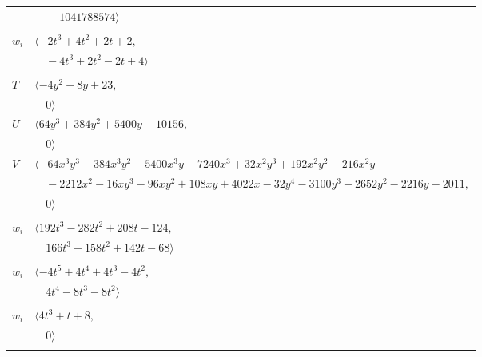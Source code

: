\documentclass[11pt]{article}
\begin{document}
\begin{longtable}{@{}ll@{}}
 & $\quad -1041788574\rangle$\\
\addlinespace[2pt]
\multicolumn{2}{@{}p{0.97\textwidth}@{}}{$i=32$, $D_i=2$, $\rho_{ij}$: $3{:}1, \allowbreak 8{:}2, \allowbreak 14{:}1, \allowbreak 22{:}2, \allowbreak 23{:}2, \allowbreak 31{:}2$}\\
$w_i$ & $\langle -2t^{3}+4t^{2}+2t+2,$\\
 & $\quad -4t^{3}+2t^{2}-2t+4\rangle$\\
\addlinespace[2pt]
\multicolumn{2}{@{}p{0.97\textwidth}@{}}{$i=33$, $D_i=18$, $\rho_{ij}$: $18{:}1, \allowbreak 20{:}1, \allowbreak 26{:}2$}\\
$T$ & $\langle -4y^{2}-8y+23,$\\
 & $\quad 0\rangle$\\
$U$ & $\langle 64y^{3}+384y^{2}+5400y+10156,$\\
 & $\quad 0\rangle$\\
$V$ & $\langle -64x^{3}y^{3}-384x^{3}y^{2}-5400x^{3}y-7240x^{3}+32x^{2}y^{3}+192x^{2}y^{2}-216x^{2}y$\\
 & $\quad -2212x^{2}-16xy^{3}-96xy^{2}+108xy+4022x-32y^{4}-3100y^{3}-2652y^{2}-2216y-2011,$\\
 & $\quad 0\rangle$\\
\addlinespace[2pt]
\multicolumn{2}{@{}p{0.97\textwidth}@{}}{$i=34$, $D_i=8$, $\rho_{ij}$: $0{:}2, \allowbreak 2{:}1, \allowbreak 8{:}2, \allowbreak 9{:}1, \allowbreak 12{:}2, \allowbreak 16{:}1, \allowbreak 20{:}1, \allowbreak 28{:}1, \allowbreak 31{:}1, \allowbreak 39{:}2$}\\
$w_i$ & $\langle 192t^{3}-282t^{2}+208t-124,$\\
 & $\quad 166t^{3}-158t^{2}+142t-68\rangle$\\
\addlinespace[2pt]
\multicolumn{2}{@{}p{0.97\textwidth}@{}}{$i=35$, $D_i=4$, $\rho_{ij}$: $7{:}1, \allowbreak 9{:}1, \allowbreak 14{:}1, \allowbreak 15{:}1, \allowbreak 19{:}1, \allowbreak 20{:}1, \allowbreak 21{:}1, \allowbreak 29{:}2$}\\
$w_i$ & $\langle -4t^{5}+4t^{4}+4t^{3}-4t^{2},$\\
 & $\quad 4t^{4}-8t^{3}-8t^{2}\rangle$\\
\addlinespace[2pt]
\multicolumn{2}{@{}p{0.97\textwidth}@{}}{$i=36$, $D_i=7$, $\rho_{ij}$: $11{:}1$}\\
$w_i$ & $\langle 4t^{3}+t+8,$\\
 & $\quad 0\rangle$\\
\addlinespace[2pt]
\multicolumn{2}{@{}p{0.97\textwidth}@{}}{$i=37$, $D_i=4$, $\rho_{ij}$: $2{:}1, \allowbreak 3{:}1, \allowbreak 6{:}1, \allowbreak 16{:}2, \allowbreak 17{:}2, \allowbreak 18{:}1, \allowbreak 19{:}2, \allowbreak 20{:}1, \allowbreak 23{:}2, \allowbreak 26{:}1, \allowbreak 31{:}1$}\\

\end{longtable}
\end{document}
